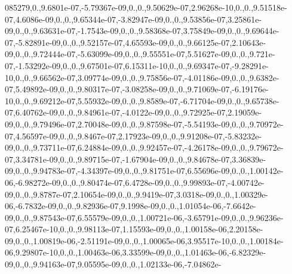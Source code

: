 \begin{DoxyCompactItemize}
085279,0.,9.\-6801e-\/07,-\/5.\-79367e-\/09,0.,0.,9.\-50629e-\/07,2.\-96268e-\/10,0.,0.,9.\-51518e-\/07,4.\-6086e-\/09,0.,0.,9.\-65344e-\/07,-\/3.\-82947e-\/09,0.,0.,9.\-53856e-\/07,3.\-25861e-\/09,0.,0.,9.\-63631e-\/07,-\/1.\-7543e-\/09,0.,0.,9.\-58368e-\/07,3.\-75849e-\/09,0.,0.,9.\-69644e-\/07,-\/5.\-82891e-\/09,0.,0.,9.\-52157e-\/07,4.\-65593e-\/09,0.,0.,9.\-66125e-\/07,2.\-10643e-\/09,0.,0.,9.\-72444e-\/07,-\/5.\-63099e-\/09,0.,0.,9.\-55551e-\/07,5.\-51627e-\/09,0.,0.,9.\-721e-\/07,-\/1.\-53292e-\/09,0.,0.,9.\-67501e-\/07,6.\-15311e-\/10,0.,0.,9.\-69347e-\/07,-\/9.\-28291e-\/10,0.,0.,9.\-66562e-\/07,3.\-09774e-\/09,0.,0.,9.\-75856e-\/07,-\/4.\-01186e-\/09,0.,0.,9.\-6382e-\/07,5.\-49892e-\/09,0.,0.,9.\-80317e-\/07,-\/3.\-08258e-\/09,0.,0.,9.\-71069e-\/07,-\/6.\-19176e-\/10,0.,0.,9.\-69212e-\/07,5.\-55932e-\/09,0.,0.,9.\-8589e-\/07,-\/6.\-71704e-\/09,0.,0.,9.\-65738e-\/07,6.\-40762e-\/09,0.,0.,9.\-84961e-\/07,-\/4.\-0122e-\/09,0.,0.,9.\-72925e-\/07,2.\-19059e-\/09,0.,0.,9.\-79496e-\/07,2.\-70048e-\/09,0.,0.,9.\-87598e-\/07,-\/5.\-54193e-\/09,0.,0.,9.\-70972e-\/07,4.\-56597e-\/09,0.,0.,9.\-8467e-\/07,2.\-17923e-\/09,0.,0.,9.\-91208e-\/07,-\/5.\-83232e-\/09,0.,0.,9.\-73711e-\/07,6.\-24884e-\/09,0.,0.,9.\-92457e-\/07,-\/4.\-26178e-\/09,0.,0.,9.\-79672e-\/07,3.\-34781e-\/09,0.,0.,9.\-89715e-\/07,-\/1.\-67904e-\/09,0.,0.,9.\-84678e-\/07,3.\-36839e-\/09,0.,0.,9.\-94783e-\/07,-\/4.\-34397e-\/09,0.,0.,9.\-81751e-\/07,6.\-55696e-\/09,0.,0.,1.\-00142e-\/06,-\/6.\-98272e-\/09,0.,0.,9.\-80474e-\/07,6.\-4728e-\/09,0.,0.,9.\-99893e-\/07,-\/4.\-00742e-\/09,0.,0.,9.\-8787e-\/07,2.\-10654e-\/09,0.,0.,9.\-9419e-\/07,3.\-0318e-\/09,0.,0.,1.\-00329e-\/06,-\/6.\-7832e-\/09,0.,0.,9.\-82936e-\/07,9.\-1998e-\/09,0.,0.,1.\-01054e-\/06,-\/7.\-6642e-\/09,0.,0.,9.\-87543e-\/07,6.\-55579e-\/09,0.,0.,1.\-00721e-\/06,-\/3.\-65791e-\/09,0.,0.,9.\-96236e-\/07,6.\-25467e-\/10,0.,0.,9.\-98113e-\/07,1.\-15593e-\/09,0.,0.,1.\-00158e-\/06,2.\-20158e-\/09,0.,0.,1.\-00819e-\/06,-\/2.\-51191e-\/09,0.,0.,1.\-00065e-\/06,3.\-95517e-\/10,0.,0.,1.\-00184e-\/06,9.\-29807e-\/10,0.,0.,1.\-00463e-\/06,3.\-33599e-\/09,0.,0.,1.\-01463e-\/06,-\/6.\-82329e-\/09,0.,0.,9.\-94163e-\/07,9.\-05595e-\/09,0.,0.,1.\-02133e-\/06,-\/7.\-04862e-\
\end{DoxyCompactItemize}
